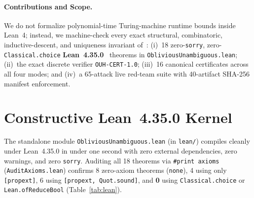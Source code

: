 \documentclass[10pt,twocolumn]{article}
\begin{document}
\paragraph{Contributions and Scope.}
We do not formalize polynomial-time Turing-machine runtime bounds inside Lean~4; instead, we machine-check every exact structural, combinatoric, inductive-descent, and uniqueness invariant of~\cite{hirsch2026note}:
(i)~18 zero-\texttt{sorry}, zero-\texttt{Classical.choice} \textbf{Lean~4.35.0}~\cite{demoura2021lean4} theorems in \texttt{ObliviousUnambiguous.lean};
(ii)~the exact discrete verifier \texttt{OUH-CERT-1.0};
(iii)~16 canonical certificates across all four modes; and
(iv)~a 65-attack live red-team suite with 40-artifact SHA-256 manifest enforcement.

\section{Constructive Lean~4.35.0 Kernel}\label{sec:lean}
The standalone module \texttt{ObliviousUnambiguous.lean} (in \texttt{lean/}) compiles cleanly under Lean~4.35.0 in under one second with zero external dependencies, zero warnings, and zero \texttt{sorry}. Auditing all 18 theorems via \texttt{\#print axioms} (\texttt{AuditAxioms.lean}) confirms 8 zero-axiom theorems (\texttt{none}), 4 using only \texttt{[propext]}, 6 using \texttt{[propext, Quot.sound]}, and \textbf{0} using \texttt{Classical.choice} or \texttt{Lean.ofReduceBool} (Table~\ref{tab:lean}).
\end{document}
